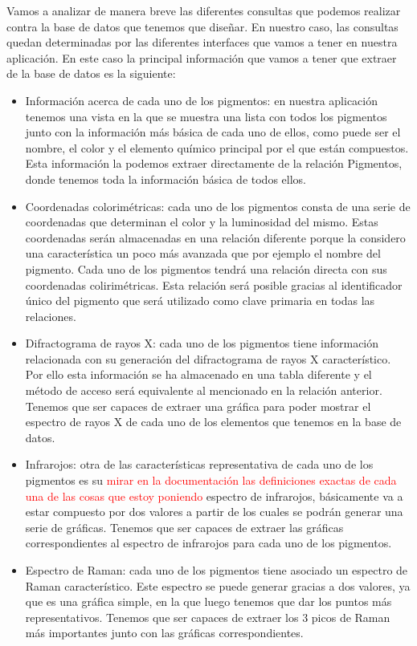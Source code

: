 Vamos a analizar de manera breve las diferentes consultas que podemos realizar contra la base de datos que tenemos que diseñar. En nuestro caso, las consultas quedan determinadas por las diferentes interfaces que vamos a tener en nuestra aplicación. En este caso la principal información que vamos a tener que extraer de la base de datos es la siguiente:

\begin{itemize}
    \item Información acerca de cada uno de los pigmentos: en nuestra aplicación tenemos una vista en la que se muestra una lista con todos los pigmentos junto con la información más básica de cada uno de ellos, como puede ser el nombre, el color y el elemento químico principal por el que están compuestos. Esta información la podemos extraer directamente de la relación Pigmentos, donde tenemos toda la información básica de todos ellos. 
    \item Coordenadas colorimétricas: cada uno de los pigmentos consta de una serie de coordenadas que determinan el color y la luminosidad del mismo. Estas coordenadas serán almacenadas en una relación diferente porque la considero una característica un poco más avanzada que por ejemplo el nombre del pigmento. Cada uno de los pigmentos tendrá una relación directa con sus coordenadas colirimétricas. Esta relación será posible gracias al identificador único del pigmento que será utilizado como clave primaria en todas las relaciones. 
    \item Difractograma de rayos X: cada uno de los pigmentos tiene información relacionada con su generación del difractograma de rayos X característico. Por ello esta información se ha almacenado en una tabla diferente y el método de acceso será equivalente al mencionado en la relación anterior. Tenemos que ser capaces de extraer una gráfica para poder mostrar el espectro de rayos X de cada uno de los elementos que tenemos en la base de datos. 
    \item Infrarojos: otra de las características representativa de cada uno de los pigmentos es su \textcolor{red}{mirar en la documentación las definiciones exactas de cada una de las cosas que estoy poniendo} espectro de infrarojos, básicamente va a estar compuesto por dos valores a partir de los cuales se podrán generar una serie de gráficas. Tenemos que ser capaces de extraer las gráficas correspondientes al espectro de infrarojos para cada uno de los pigmentos.
    \item Espectro de Raman: cada uno de los pigmentos tiene asociado un espectro de Raman característico. Este espectro se puede generar gracias a dos valores, ya que es una gráfica simple, en la que luego tenemos que dar los puntos más representativos. Tenemos que ser capaces de extraer los 3 picos de Raman más importantes junto con las gráficas correspondientes. 
\end{itemize}